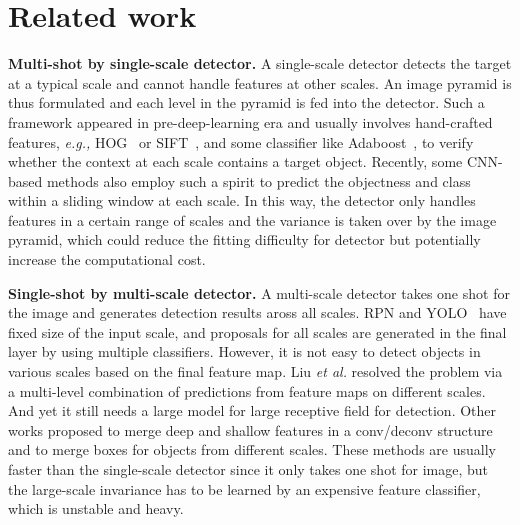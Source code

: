 \documentclass[10pt,twocolumn,letterpaper]{article}
\begin{document}
\vspace{-0.3cm}
\section{Related work}
\textbf{Multi-shot by single-scale detector.} 
A single-scale detector detects the target at a typical scale and cannot handle features at other scales. 
%
An image pyramid is thus formulated and each level in the pyramid is fed  into  the detector.
%
%
Such a framework appeared in pre-deep-learning  era \cite{Felzenszwalb2010Cascade,chen2014joint} and usually involves hand-crafted features, \textit{e.g.,}  
HOG~\cite{Dalal2005Histograms} or SIFT~\cite{lowe2004distinctive},
and some classifier like Adaboost~\cite{viola2004robust}, to verify whether the context at each scale contains a target object. 
%
%
Recently, 
%
%
some CNN-based methods \cite{li2015convolutional,overfeat} also employ such a spirit to
predict the objectness and class within a sliding window at each scale. 
In this way, the detector only handles features in a certain range of scales and the variance is taken over by the image pyramid, which could reduce the fitting difficulty for detector but potentially increase the computational cost.

\textbf{Single-shot by multi-scale detector.} 
A multi-scale detector takes one shot for the image and generates detection results aross all scales.
RPN \cite{faster_rcnn} and YOLO~\cite{redmon2016you} have fixed size of the input scale, and proposals for all scales are generated in the final layer by using multiple classifiers. 
%
However,  it is not easy to detect  objects in various scales based on the final feature map.
%
Liu \textit{et al.} \cite{liu2016ssd} resolved the problem via a multi-level combination of predictions from  feature maps on 
different scales.
And yet it still needs a large model for large receptive field for detection. 
%
Other works \cite{lin2016feature,li2017zoom}
proposed to merge deep and shallow features in a conv/deconv structure and 
to merge boxes for objects from different scales.
These methods are usually faster than the single-scale detector since it only takes one shot for image, but the large-scale invariance  has to be learned by an expensive feature classifier, which is unstable and heavy.
\end{document}
